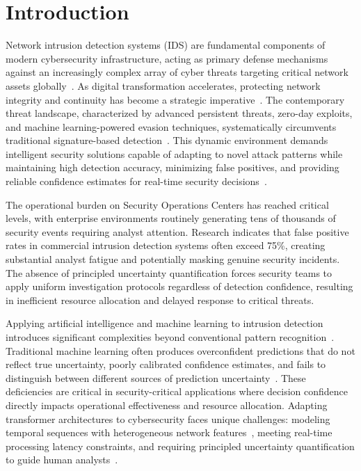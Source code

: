\documentclass[journal]{IEEEtran}
\begin{document}
\section{Introduction}

Network intrusion detection systems (IDS) are fundamental components of modern cybersecurity infrastructure, acting as primary defense mechanisms against an increasingly complex array of cyber threats targeting critical network assets globally~\cite{buczak2016survey}. As digital transformation accelerates, protecting network integrity and continuity has become a strategic imperative~\cite{khraisat2019survey}. The contemporary threat landscape, characterized by advanced persistent threats, zero-day exploits, and machine learning-powered evasion techniques, systematically circumvents traditional signature-based detection~\cite{apruzzese2018addressing}. This dynamic environment demands intelligent security solutions capable of adapting to novel attack patterns while maintaining high detection accuracy, minimizing false positives, and providing reliable confidence estimates for real-time security decisions~\cite{ring2019survey}.

The operational burden on Security Operations Centers has reached critical levels, with enterprise environments routinely generating tens of thousands of security events requiring analyst attention. Research indicates that false positive rates in commercial intrusion detection systems often exceed 75\%, creating substantial analyst fatigue and potentially masking genuine security incidents. The absence of principled uncertainty quantification forces security teams to apply uniform investigation protocols regardless of detection confidence, resulting in inefficient resource allocation and delayed response to critical threats.

Applying artificial intelligence and machine learning to intrusion detection introduces significant complexities beyond conventional pattern recognition~\cite{xin2018machine}. Traditional machine learning often produces overconfident predictions that do not reflect true uncertainty, poorly calibrated confidence estimates, and fails to distinguish between different sources of prediction uncertainty~\cite{kendall2017uncertainties}. These deficiencies are critical in security-critical applications where decision confidence directly impacts operational effectiveness and resource allocation. Adapting transformer architectures to cybersecurity faces unique challenges: modeling temporal sequences with heterogeneous network features~\cite{vaswani2017attention}, meeting real-time processing latency constraints, and requiring principled uncertainty quantification to guide human analysts~\cite{gal2016dropout}.
\end{document}
